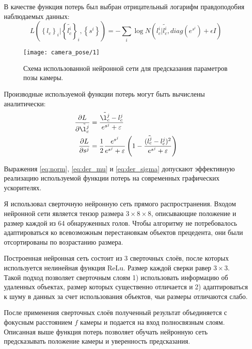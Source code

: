 В качестве функция потерь был выбран отрицательный логарифм правдоподобия наблюдаемых данных:
\begin{equation}
L(\left\{l_c\right\}_i | \left\{ \tilde{l_c^i} \right\}_i, \left\{s^i\right\}) = -\sum_i\log N(l_{c}^i|\tilde{l_c^i}, diag\left(e^{s^i}\right) + \epsilon I)
\label{eq:norm}
\end{equation}

\begin{figure*}[!t]
	\centering
	\texttt{[image: camera\_pose/1]}
	\caption{Схема использованной нейронной сети для предсказания параметров позы камеры.}
	\label{fig:net}
\end{figure*}

Производные используемой функции потерь могут быть вычислены аналитически:
\begin{align}
	\frac{\partial L}{\partial \tilde{\l_c^j}} &= 
	\frac{\tilde{\l_c^j} - l_c^j}{e^{s^j} + \epsilon}
	\label{eq:der_mu} \\
	\frac{\partial L}{\partial s^j} &= 
	\frac{1}{2}\frac{e^{s^j}}{e^{s^j} + \epsilon}
	\left(1 - \frac{(\tilde{l_c^j} - l_c^j) ^ 2}{e^{s^j} + \epsilon}\right)  \label{eq:der_sigma}
\end{align}

Выражения \eqref{eq:norm}, \eqref{eq:der_mu} и \eqref{eq:der_sigma} допускают эффективную реализацию используемой функции потерь на современных графических ускорителях.

Я использовал сверточную нейронную сеть прямого распространения. Входом нейронной сети является тензор размера $3\times8\times8$, описывающие положение и размер каждой из 64 обнаруженных голов. Чтобы алгоритму не потребовалось адаптироваться ко всевозможным перестановкам объектов прецедента, они были отсортированы по возрастанию размера.

Построенная нейронная сеть состоит из 3 сверточных слоёв, после которых используется нелинейная функция ReLu. Размер каждой сверки равер $3\times3$. Такой подход позволяет сверточным слоям 1) использовать информацию об удаленных объектах, размер которых существенно отличается и 2) адаптироваться к шуму в данных за счет использования объектов, чьи размеры отличаются слабо.

После применения сверточных слоёв полученный результат объединяется с фокусным расстоянием $f$ камеры и подается на вход полносвязным слоям. Описанная выше функция потерь позволяет обучать нейронную сеть предсказывать положение камеры и уверенность предсказания.


